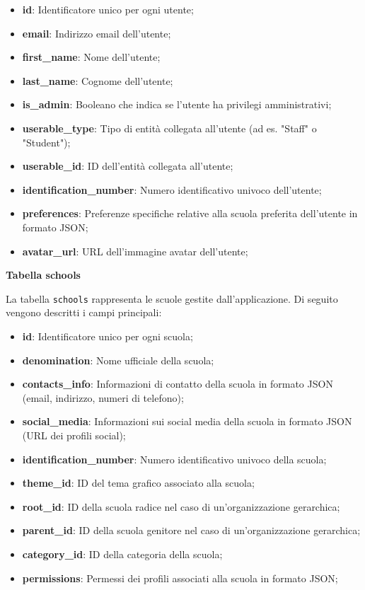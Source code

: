 \documentclass[a4paper, 12pt]{book}
\begin{document}
\begin{itemize}
  \item \textbf{id}: Identificatore unico per ogni utente;
  \item \textbf{email}: Indirizzo email dell'utente;
  \item \textbf{first\_name}: Nome dell'utente;
  \item \textbf{last\_name}: Cognome dell'utente;
  \item \textbf{is\_admin}: Booleano che indica se l'utente ha privilegi amministrativi;
  \item \textbf{userable\_type}: Tipo di entità collegata all'utente (ad es. "Staff" o "Student");
  \item \textbf{userable\_id}: ID dell'entità collegata all'utente;
  \item \textbf{identification\_number}: Numero identificativo univoco dell'utente;
  \item \textbf{preferences}: Preferenze specifiche relative alla scuola preferita dell'utente in formato JSON;
  \item \textbf{avatar\_url}: URL dell'immagine avatar dell'utente;
\end{itemize}

\textbf{Tabella schools}

La tabella \texttt{schools} rappresenta le scuole gestite dall'applicazione. Di seguito vengono descritti i campi principali:

\begin{itemize}
  \item \textbf{id}: Identificatore unico per ogni scuola;
  \item \textbf{denomination}: Nome ufficiale della scuola;
  \item \textbf{contacts\_info}: Informazioni di contatto della scuola in formato JSON (email, indirizzo, numeri di
        telefono);
  \item \textbf{social\_media}: Informazioni sui social media della scuola in formato JSON (URL dei profili social);
  \item \textbf{identification\_number}: Numero identificativo univoco della scuola;
  \item \textbf{theme\_id}: ID del tema grafico associato alla scuola;
  \item \textbf{root\_id}: ID della scuola radice nel caso di un'organizzazione gerarchica;
  \item \textbf{parent\_id}: ID della scuola genitore nel caso di un'organizzazione gerarchica;
  \item \textbf{category\_id}: ID della categoria della scuola;
  \item \textbf{permissions}: Permessi dei profili associati alla scuola in formato JSON;
\end{itemize}
\end{document}
